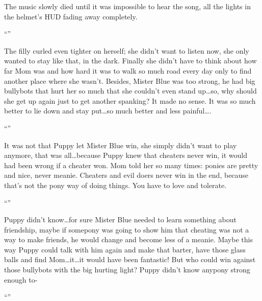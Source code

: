 The music slowly died until it was impossible to hear the song, all the lights in the helmet's HUD fading away completely.

\horizonline

\englishunknowndaytimeplace

``''

The filly curled even tighter on herself; she didn't want to listen now, she only wanted to stay like that, in the dark. Finally she didn't have to think about how far Mom was and how hard it was to walk so much road every day only to find another place where she wasn't. Besides, Mister Blue was too strong, he had big bullybots that hurt her so much that she couldn't even stand up\dots so, why should she get up again just to get another spanking? It made no sense. It was so much better to lie down and stay put\dots so much better and less painful\dots.

``''

It was not that Puppy let Mister Blue win, she simply didn't want to play anymore, that was all\dots because Puppy knew that cheaters never win, it would had been wrong if a cheater won. Mom told her so many times: ponies are pretty and nice, never meanie. Cheaters and evil doers never win in the end, because that's not the pony way of doing things. You have to love and tolerate.

``''

Puppy didn't know\dots for sure Mister Blue needed to learn something about friendship, maybe if somepony was going to show him that cheating was not a way to make friends, he would change and become less of a meanie. Maybe this way Puppy could talk with him again and make that barter, have those glass balls and find Mom\dots it\dots it would have been fantastic! But who could win against those bullybots with the big hurting light? Puppy didn't know anypony strong enough to-

``''

\horizonline

